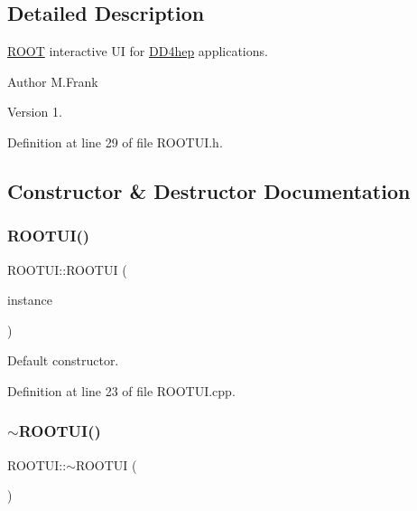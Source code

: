 \subsection{Detailed Description}
\hyperlink{namespace_r_o_o_t}{R\+O\+OT} interactive UI for \hyperlink{namespace_d_d4hep}{D\+D4hep} applications. 

\begin{DoxyAuthor}{Author}
M.\+Frank 
\end{DoxyAuthor}
\begin{DoxyVersion}{Version}
1. 
\end{DoxyVersion}


Definition at line 29 of file R\+O\+O\+T\+U\+I.\+h.



\subsection{Constructor \& Destructor Documentation}
\hypertarget{class_d_d4hep_1_1_r_o_o_t_u_i_ab1850fd130f80807ff936d85f307e3e0}{}\label{class_d_d4hep_1_1_r_o_o_t_u_i_ab1850fd130f80807ff936d85f307e3e0} 
\subsubsection{\texorpdfstring{R\+O\+O\+T\+U\+I()}{ROOTUI()}}
{\footnotesize\ttfamily R\+O\+O\+T\+U\+I\+::\+R\+O\+O\+T\+UI (\begin{DoxyParamCaption}\item[{\hyperlink{class_d_d4hep_1_1_geometry_1_1_l_c_d_d}{Geometry\+::\+L\+C\+DD} \&}]{instance }\end{DoxyParamCaption})}



Default constructor. 



Definition at line 23 of file R\+O\+O\+T\+U\+I.\+cpp.

\hypertarget{class_d_d4hep_1_1_r_o_o_t_u_i_a029c3848c27bda2a4d12e706918c109f}{}\label{class_d_d4hep_1_1_r_o_o_t_u_i_a029c3848c27bda2a4d12e706918c109f} 
\subsubsection{\texorpdfstring{$\sim$\+R\+O\+O\+T\+U\+I()}{~ROOTUI()}}
{\footnotesize\ttfamily R\+O\+O\+T\+U\+I\+::$\sim$\+R\+O\+O\+T\+UI (\begin{DoxyParamCaption}{ }\end{DoxyParamCaption})\hspace{0.3cm}{\ttfamily [virtual]}}



